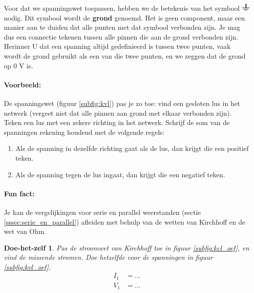 \documentclass{article}
\newtheorem{DIY}{Doe-het-zelf}
\begin{document}
			Voor dat we spanningswet toepassen, hebben we de betekenis van het symbool \includegraphics[height=1em]{gnd.pdf} nodig. Dit symbool wordt de \textbf{grond} genoemd. Het is geen component, maar een manier aan te duiden dat alle punten met dat symbool verbonden zijn. Je mag dus een connectie tekenen tussen alle pinnen die aan de grond verbonden zijn. Herinner U dat een spanning altijd gedefinieerd is tussen twee punten, vaak wordt de grond gebruikt als een van die twee punten, en we zeggen dat de grond op 0 V is.

			\paragraph*{Voorbeeld:} De spanningswet (figuur \ref{subfig:kvl}) pas je zo toe: vind een gesloten lus in het netwerk (vergeet niet dat alle pinnen aan grond met elkaar verbonden zijn). Teken een lus met een zekere richting in het netwerk. Schrijf de som van de spanningen rekening houdend met de volgende regels:

			\begin{enumerate}
			 	\item Als de spanning in dezelfde richting gaat als de lus, dan krijgt die een positief teken.
			 	\item Als de spanning tegen de lus ingaat, dan krijgt die een negatief teken.
			 \end{enumerate}


			\paragraph*{Fun fact:} Je kan de vergelijkingen voor serie en parallel weerstanden (sectie \ref{sssec:serie_en_parallel}) afleiden met behulp van de wetten van Kirchhoff en de wet van Ohm.

			\begin{DIY} Pas de stroomwet van Kirchhoff toe in figuur \ref{subfig:kcl_oef}, en vind de missende stromen. Doe hetzelfde voor de spanningen in figuur \ref{subfig:kvl_oef}.
			\begin{align*}
			    I_1 &= \ldots \\
			    V_1 &= \ldots 
			\end{align*}
			\end{DIY}
\end{document}

